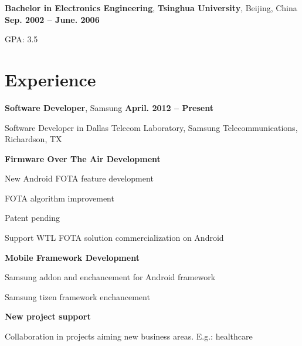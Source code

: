 \documentclass[overlapped, line]{resume}
\begin{document}
\begin{resume}
         {\bf Bachelor in Electronics Engineering}, \textbf{Tsinghua University}, Beijing, China \hfill {\bf Sep. 2002 -- June. 2006}\\
         \vspace{-10pt}      %
         \begin{list2}
         \item GPA: 3.5
         \end{list2}  \vspace{-5pt}
         \vspace{-15pt}\section{Experience}
         {\bf Software Developer}, Samsung \hfill {\bf April. 2012 -- Present}\\
         \vspace{-10pt}      %
         \begin{list2}
         \item Software Developer in Dallas Telecom Laboratory, Samsung Telecommunications, Richardson, TX
         \item \textbf{Firmware Over The Air Development}
           \begin{list2}
           \item New Android FOTA feature development
           \item FOTA algorithm improvement
           \item 
           \begin{list2}
           \item Patent pending
           \end{list2}
           \end{list2}
           \item Support WTL FOTA solution commercialization on Android
         \item \textbf{Mobile Framework Development}
           \begin{list2}
           \item Samsung addon and enchancement for Android framework
           \item Samsung tizen framework enchancement
           \end{list2}
         \item \textbf{New project support}
           \begin{list2}
           \item Collaboration in projects aiming new business areas. E.g.: healthcare
           \end{list2}          
         \end{list2}  \vspace{-5pt}


\end{resume}
\end{document}
